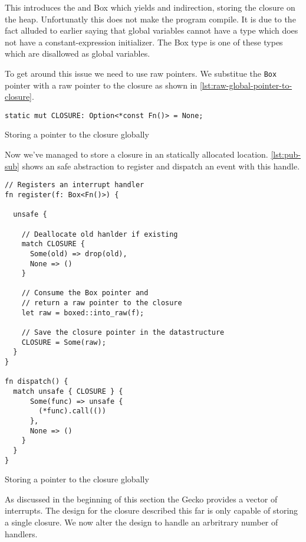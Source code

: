 This introduces the and Box which yields and indirection, storing the closure on the heap.
Unfortunatly this does not make the program compile.
It is due to the fact alluded to earlier saying that global variables cannot have a type which does not have a constant-expression initializer.
The Box type is one of these types which are disallowed as global variables.

To get around this issue we need to use raw pointers.
We substitue the \texttt{Box} pointer with a raw pointer to the closure as shown in \autoref{lst:raw-global-pointer-to-closure}.

\begin{listing}[H]
  \begin{verbatim}
static mut CLOSURE: Option<*const Fn()> = None;
  \end{verbatim}
  \caption{Storing a pointer to the closure globally}
  \label{lst:raw-global-pointer-to-closure}
\end{listing}

Now we've managed to store a closure in an statically allocated location.
\autoref{lst:pub-sub} shows an safe abstraction to register and dispatch an event with this handle.

\begin{listing}[H]
  \begin{verbatim}
// Registers an interrupt handler
fn register(f: Box<Fn()>) {

  unsafe {

    // Deallocate old hanlder if existing
    match CLOSURE {
      Some(old) => drop(old),
      None => ()
    }

    // Consume the Box pointer and
    // return a raw pointer to the closure
    let raw = boxed::into_raw(f);

    // Save the closure pointer in the datastructure
    CLOSURE = Some(raw);
  }
}

fn dispatch() {
  match unsafe { CLOSURE } {
      Some(func) => unsafe {
        (*func).call(())
      },
      None => ()
    }
  }
}
  \end{verbatim}
  \caption{Storing a pointer to the closure globally}
  \label{lst:raw-global-pointer-to-closure}
\end{listing}

As discussed in the beginning of this section the Gecko provides a vector of interrupts.
The design for the closure described this far is only capable of storing a single closure.
We now alter the design to handle an arbritrary number of handlers.

